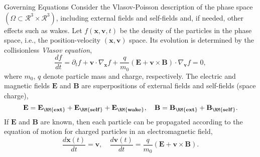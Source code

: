 \documentclass[xcolor=pdftex,table,10pt,yellow,mathserif]{beamer}
\begin{document}
\begin{frame}{Governing Equations} {}
Consider the Vlasov-Poisson description of the phase space $(\Omega \subset \mathcal{R}^3 \times \mathcal{R}^3)$, including external fields and
self-fields and, if needed, other effects such as wakes. 
Let $f(\mathbf{x},\mathbf{v},t)$  be the density of the particles in the
phase space, i.e., the position-velocity $(\mathbf{x}, \mathbf{v})$
space.  Its evolution is determined by the collisionless \emph{Vlasov equation},
\begin{equation*}\label{eq:Vlasov}
  \frac{df}{dt}=\partial_t f + \mathbf{v} \cdot \nabla_{\mathbf{x}} f
  +\frac{q}{m_0}(\mathbf{E}+ \mathbf{v}\times\mathbf{B})\cdot
  \nabla_{\mathbf{v}} f  =  0,
\end{equation*}
where $m_0$, $q$ denote particle mass and charge, respectively.  The
electric and magnetic fields $\mathbf{E}$ and $\mathbf{B}$ are
superpositions of external fields and self-fields (space charge),
\begin{equation*}\label{eq:allfield}
    \mathbf{E} =
    \mathbf{E_{\RM{ext}}} + \mathbf{E_{\RM{self}}}  + \mathbf{E_{\RM{wake}}}, \quad
    \mathbf{B} =
    \mathbf{B_{\RM{ext}}} + \mathbf{B_{\RM{self}}}.
\end{equation*}
If $\mathbf{E}$ and $\mathbf{B}$ are known, then each particle can be
propagated according to the equation of motion for charged particles in an
electromagnetic field,
\begin{equation*}\label{eq:motion}
  \frac{d\mathbf{x}(t)}{dt}  = \mathbf{v},
  \quad
  \frac{d\mathbf{v}(t)}{dt}  = \frac{q}{m_0}\left(\mathbf{E} +
    \mathbf{v}\times \mathbf{B}\right).
\end{equation*}

 \end{frame}
\end{document}
